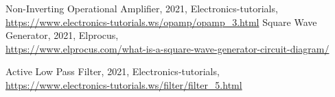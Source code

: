 \documentclass[a4paper,11pt,norsk]{article}
\begin{document}
{}
\begin{thebibliography}{99}

 Non-Inverting Operational Amplifier, 2021, Electronics-tutorials, \\
\href{https://www.electronics-tutorials.ws/opamp/opamp\_3.html}{https://www.electronics-tutorials.ws/opamp/opamp\_3.html}
 Square Wave Generator, 2021, Elprocus, \\
\href{https://www.elprocus.com/what-is-a-square-wave-generator-circuit-diagram/}{https://www.elprocus.com/what-is-a-square-wave-generator-circuit-diagram/}

 Active Low Pass Filter, 2021, Electronics-tutorials, \\
\href{https://www.electronics-tutorials.ws/filter/filter\_5.html}{https://www.electronics-tutorials.ws/filter/filter\_5.html}

\end{thebibliography}
\end{document}
